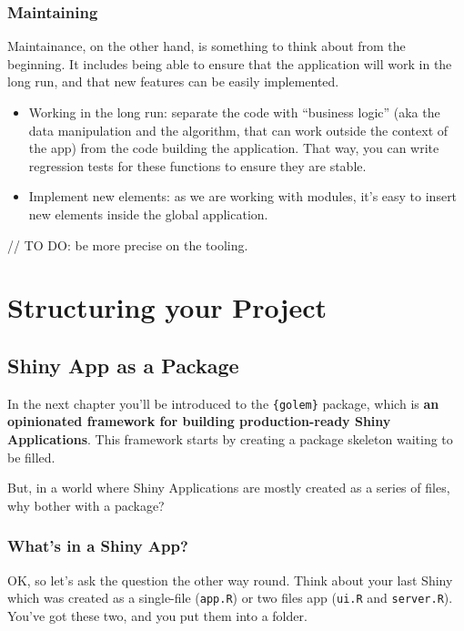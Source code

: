 \documentclass[]{book}
\providecommand{\tightlist}{%
  \setlength{\itemsep}{0pt}\setlength{\parskip}{0pt}}
\begin{document}
\hypertarget{maintaining}{%
\subsection{Maintaining}\label{maintaining}}

Maintainance, on the other hand, is something to think about from the beginning. It includes being able to ensure that the application will work in the long run, and that new features can be easily implemented.

\begin{itemize}
\tightlist
\item
  Working in the long run: separate the code with ``business logic'' (aka the data manipulation and the algorithm, that can work outside the context of the app) from the code building the application. That way, you can write regression tests for these functions to ensure they are stable.
\item
  Implement new elements: as we are working with modules, it's easy to insert new elements inside the global application.
\end{itemize}

// TO DO: be more precise on the tooling.

\hypertarget{structure}{%
\chapter{Structuring your Project}\label{structure}}

\hypertarget{shiny-app-as-a-package}{%
\section{Shiny App as a Package}\label{shiny-app-as-a-package}}

In the next chapter you'll be introduced to the \texttt{\{golem\}} package, which is \textbf{an opinionated framework for building production-ready Shiny Applications}. This framework starts by creating a package skeleton waiting to be filled.

But, in a world where Shiny Applications are mostly created as a series of files, why bother with a package?

\hypertarget{whats-in-a-shiny-app}{%
\subsection{What's in a Shiny App?}\label{whats-in-a-shiny-app}}

OK, so let's ask the question the other way round. Think about your last Shiny which was created as a single-file (\texttt{app.R}) or two files app (\texttt{ui.R} and \texttt{server.R}). You've got these two, and you put them into a folder.
\end{document}
